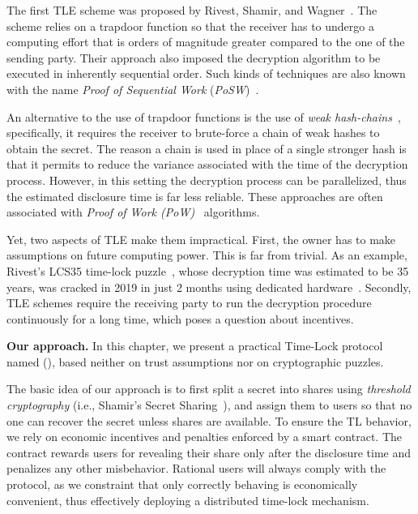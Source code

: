 The first TLE scheme was proposed by Rivest, Shamir, and Wagner~\cite{Rivest:1996:TPT:888615}.
The scheme relies on a trapdoor function so that the receiver has to undergo a computing effort that is orders of magnitude greater compared to the one of the sending party. Their approach also imposed the decryption algorithm to be executed in inherently sequential order.
Such kinds of techniques are also known with the name {\em Proof of Sequential Work} ({\em PoSW})~\cite{posw,cohen2018}.

An alternative to the use of trapdoor functions is the use of {\em weak hash-chains}~\cite{gwern}, specifically, it requires the receiver to brute-force a chain of weak hashes to obtain the secret.
The reason a chain is used in place of a single stronger hash is that it permits to reduce the variance associated with the time of the decryption process. 
However, in this setting the decryption process can be parallelized, thus the estimated disclosure time is far less reliable.
These approaches are often associated with {\em Proof of Work (PoW)}~\cite{pow} algorithms.

Yet, two aspects of TLE make them impractical. First,
%
the owner has to make assumptions on future computing power. 
This is far from trivial.
As an example, Rivest's LCS35 time-lock puzzle~\cite{lcs35}, whose decryption time was estimated to be 35 years, was cracked in 2019 in just 2 months using dedicated hardware~\cite{lcs35-crack-open}.
%
Secondly, TLE schemes require the receiving party to run the decryption procedure continuously for a long time, which poses a question about incentives.


\medskip\textbf{Our approach.} In this chapter, we present a practical Time-Lock protocol named {\em \name} ({\em \shortname}), based neither on trust assumptions nor on cryptographic puzzles.

The basic idea of our approach is to first split a secret into shares using {\em threshold cryptography} (i.e., Shamir's Secret Sharing~\cite{Shamir:1979:SS:359168.359176}), and assign them to users so that no one can recover the secret unless \KofN shares are available.
To ensure the TL behavior, we rely on economic incentives and penalties enforced by a smart contract.
The contract rewards users for revealing their share only after the disclosure time and penalizes any other misbehavior.
Rational users will always comply with the protocol, as we constraint that only correctly behaving is economically convenient, thus effectively deploying a distributed time-lock mechanism.

